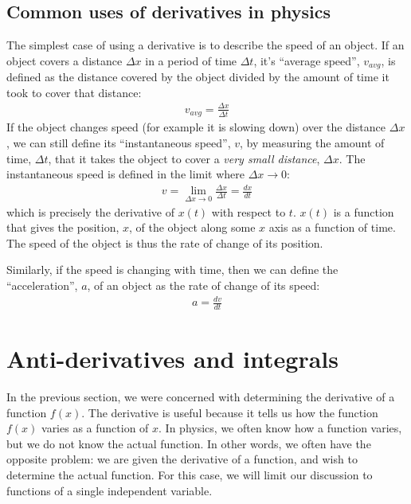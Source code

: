 \subsection{Common uses of derivatives in physics}
The simplest case of using a derivative is to describe the speed of an object. If an object covers a distance $\Delta x$ in a period of time $\Delta t$, it's ``average speed'', $v_{avg}$, is defined as the distance covered by the object divided by the amount of time it took to cover that distance:
\begin{align*}
v_{avg} = \frac{\Delta x}{\Delta t}
\end{align*}
If the object changes speed (for example it is slowing down) over the distance $\Delta x$, we can still define its ``instantaneous speed'', $v$, by measuring the amount of time, $\Delta t$, that it takes the object to cover a \textit{very small distance}, $\Delta x$. The instantaneous speed is defined in the limit where $\Delta x \to 0$:
\begin{align*}
v = \lim_{\Delta x\to 0}\frac{\Delta x}{\Delta t}=\frac{dx}{dt}
\end{align*} 
which is precisely the derivative of $x(t)$ with respect to $t$. $x(t)$ is a function that gives the position, $x$, of the object along some $x$ axis as a function of time. The speed of the object is thus the rate of change of its position.

Similarly, if the speed is changing with time, then we can define the ``acceleration'', $a$, of an object as the rate of change of its speed:
\begin{align*}
a = \frac{dv}{dt}
\end{align*}


\section{Anti-derivatives and integrals}
In the previous section, we were concerned with determining the derivative of a function $f(x)$. The derivative is useful because it tells us how the function $f(x)$ varies as a function of $x$. In physics, we often know how a function varies, but we do not know the actual function. In other words, we often have the opposite problem: we are given the derivative of a function, and wish to determine the actual function. For this case, we will limit our discussion to functions of a single independent variable.

